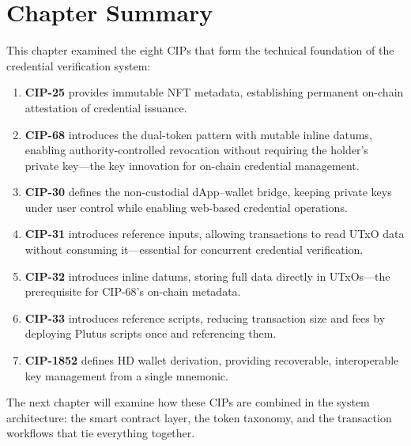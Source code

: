 \section{Chapter Summary}
\label{sec:cips-summary}

This chapter examined the eight CIPs that form the technical foundation of
the credential verification system:

\begin{enumerate}[nosep]
  \item \textbf{CIP-25} provides immutable NFT metadata, establishing
    permanent on-chain attestation of credential issuance.
  \item \textbf{CIP-68} introduces the dual-token pattern with mutable
    inline datums, enabling authority-controlled revocation without requiring
    the holder's private key---the key innovation for on-chain credential
    management.
  \item \textbf{CIP-30} defines the non-custodial dApp--wallet bridge,
    keeping private keys under user control while enabling web-based
    credential operations.
  \item \textbf{CIP-31} introduces reference inputs, allowing transactions
    to read UTxO data without consuming it---essential for concurrent
    credential verification.
  \item \textbf{CIP-32} introduces inline datums, storing full data directly
    in UTxOs---the prerequisite for CIP-68's on-chain metadata.
  \item \textbf{CIP-33} introduces reference scripts, reducing transaction
    size and fees by deploying Plutus scripts once and referencing them.
  \item \textbf{CIP-1852} defines HD wallet derivation, providing
    recoverable, interoperable key management from a single mnemonic.
\end{enumerate}

The next chapter will examine how these CIPs are combined in the system
architecture: the smart contract layer, the token taxonomy, and the
transaction workflows that tie everything together.
